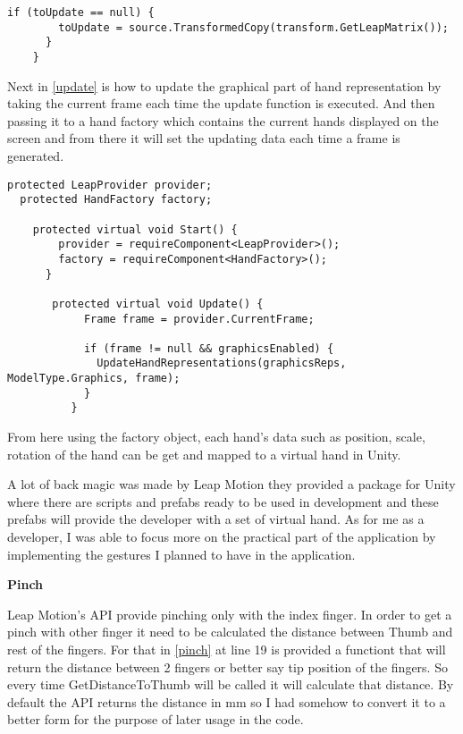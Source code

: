 {\begin{lstlisting}[caption={Leap Motion tracking matrix data.},label={matrix}]
      if (toUpdate == null) {
        toUpdate = source.TransformedCopy(transform.GetLeapMatrix());
      }
    } 
\end{lstlisting}

Next in \autoref{update} is how to update the graphical part of hand representation by taking the current frame each time the update function is executed. And then passing it to a hand factory which contains the current hands displayed on the screen and from there it will set the updating data each time a frame is generated.

\begin{lstlisting}[caption={Updating hand representations },label={update}]
  protected LeapProvider provider;
  protected HandFactory factory;
  
    protected virtual void Start() {
        provider = requireComponent<LeapProvider>();
        factory = requireComponent<HandFactory>();
      }
      
       protected virtual void Update() {
            Frame frame = provider.CurrentFrame;
      
            if (frame != null && graphicsEnabled) {
              UpdateHandRepresentations(graphicsReps, ModelType.Graphics, frame);
            }
          }
\end{lstlisting}

From here  using the factory object, each hand's data such as position, scale, rotation of the hand can be get and mapped to a virtual hand in Unity. 

A lot of back magic was made by Leap Motion they provided a package for Unity where there are scripts and prefabs ready to be used in development and these prefabs will provide the developer with a set of virtual hand. As for me as a developer, I was able to focus more on the practical part of the application by implementing the gestures I planned to have in the application.

\textbf{Pinch}

Leap Motion's API provide pinching only with the index finger. In order to get a pinch with other finger it need to be calculated the distance between Thumb and rest of the fingers. For that in \autoref{pinch} at line 19 is provided a functiont that will return the distance between 2 fingers or better say tip position of the fingers. So every time GetDistanceToThumb will be called it will calculate that distance. By default the API returns the distance in mm so I had somehow to convert it to a better form for the purpose of later usage in the code.

}

